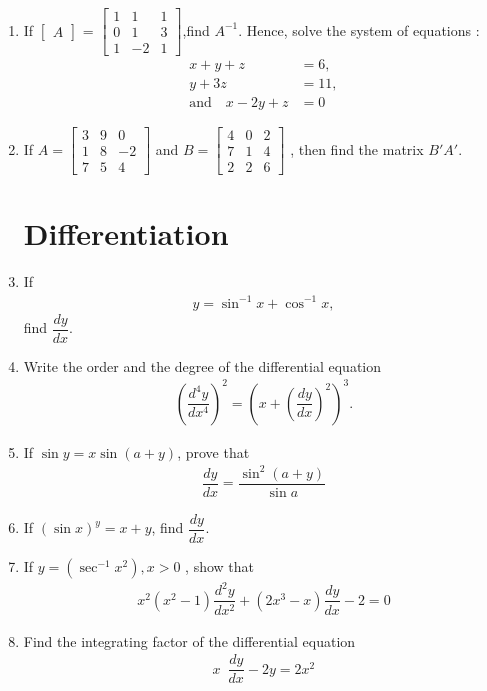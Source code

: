 \documentclass[12pt,-letter paper]{article}
\providecommand{\myvec}[1]{\ensuremath{\begin{bmatrix}#1\end{bmatrix}}}
\providecommand{\brak}[1]{\ensuremath{\left(#1\right)}}
\begin{document}
\begin{enumerate}
\item If \myvec {A} = \myvec{1&1&1\\0&1&3\\1&-2&1},find $A^{-1}$.
Hence, solve the system of equations :
\begin{align*}
    x+y+z&=6 ,\\
    y+3z&=11 ,\\
    \text  {and} \hspace{12pt}x-2y+z&= 0
\end{align*}

\item If $A = \myvec{3&9&0\\1&8&-2\\7&5&4}$ and $B = \myvec{4&0&2\\7&1&4\\2&2&6}$ , then find the matrix $B'A'$.

\section{Differentiation}

\item If
\begin{align*}
    y = \sin ^{-1} {x} + \cos^{-1} {x},
\end{align*}
 find $\dfrac{dy}{dx}$.
 
\item Write the order and the degree of the differential equation
\begin{align*}
    \brak{\dfrac{d^4y}{dx^4}}^2=\brak{x+\brak{\dfrac{dy}{dx}}^2}^3.
\end{align*}

\item If $\sin y = x \sin (a + y)$, prove that 
\begin{align*}
    \dfrac{dy}{dx} =\dfrac{\sin^{2}(a+y)}{\sin {a}}
\end{align*}

\item If $(\sin x)^y= x + y$, find $\dfrac{dy}{dx}$.

\item If $y=\brak{\sec^{-1}{x}^{2}},x>0$ , show that 
\begin{align*}
    x^2(x^2-1)\dfrac{d^{2}y}{dx^{2}}+(2x^{3}-x)\dfrac{dy}{dx}-2=0
\end{align*}

\item Find the integrating factor of the differential equation 
\begin{align*}
x \hspace{6pt} \dfrac{dy}{dx}-2y  = 2x^{2}
\end{align*}


\end{enumerate}
\end{document}
